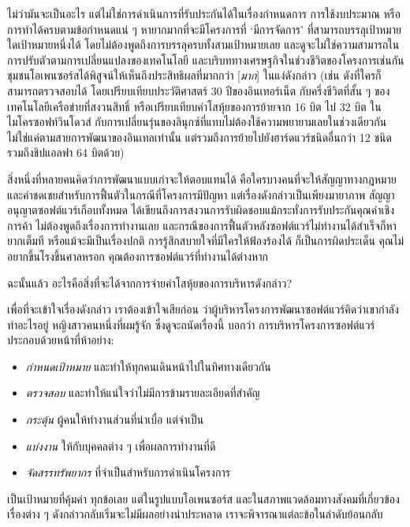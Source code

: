 ไม่ว่ามันจะเป็นอะไร แต่ไม่ใช่การดำเนินการที่รับประกันได้ในเรื่องกำหนดการ
การใช้งบประมาณ หรือการทำได้ครบตามข้อกำหนดแน่ ๆ  หายากมากที่จะมีโครงการที่
`มีการจัดการ' ที่สามารถบรรลุเป้าหมายใดเป้าหมายหนึ่งได้
โดยไม่ต้องพูดถึงการบรรลุครบทั้งสามเป้าหมายเลย
และดูจะไม่ใช่ความสามารถในการปรับตัวตามการเปลี่ยนแปลงของเทคโนโลยี
และบริบททางเศรษฐกิจในช่วงชีวิตของโครงการเช่นกัน
ชุมชนโอเพนซอร์สได้พิสูจน์ให้เห็นถึงประสิทธิผลที่มากกว่า {[}\emph{มาก}{]}
ในแง่ดังกล่าว (เช่น ดังที่ใครก็สามารถตรวจสอบได้
โดยเปรียบเทียบประวัติศาสตร์ 30 ปีของอินเทอร์เน็ต กับครึ่งชีวิตที่สั้น ๆ
ของเทคโนโลยีเครือข่ายที่สงวนสิทธิ์ หรือเปรียบเทียบค่าโสหุ้ยของการย้ายจาก
16 บิต ไป 32 บิต ในไมโครซอฟท์วินโดวส์
กับการเปลี่ยนรุ่นของลินุกซ์ที่แทบไม่ต้องใช้ความพยายามเลยในช่วงเดียวกัน
ไม่ใช่แค่ตามสายการพัฒนาของอินเทลเท่านั้น
แต่รวมถึงการย้ายไปยังฮาร์ดแวร์ชนิดอื่นกว่า 12 ชนิด รวมถึงชิปแอลฟา 64
บิตด้วย)

สิ่งหนึ่งที่หลายคนคิดว่าการพัฒนาแบบเก่าจะให้ตอบแทนได้
คือใครบางคนที่จะให้สัญญาทางกฎหมาย
และค่าชดเชยสำหรับการฟื้นตัวในกรณีที่โครงการมีปัญหา
แต่เรื่องดังกล่าวเป็นเพียงมายาภาพ สัญญาอนุญาตซอฟต์แวร์เกือบทั้งหมด
ได้เขียนถึงการสงวนการรับผิดชอบแม้กระทั่งการรับประกันคุณค่าเชิงการค้า
ไม่ต้องพูดถึงเรื่องการทำงานเลย
และกรณีของการฟื้นตัวหลังซอฟต์แวร์ไม่ทำงานได้สำเร็จก็หายากเต็มที
หรือแม้จะมีเป็นเรื่องปกติ การรู้สึกสบายใจที่มีใครให้ฟ้องร้องได้
ก็เป็นการผิดประเด็น คุณไม่อยากขึ้นโรงขึ้นศาลหรอก
คุณต้องการซอฟต์แวร์ที่ทำงานได้ต่างหาก

\noindent ฉะนั้นแล้ว อะไรคือสิ่งที่จะได้จากการจ่ายค่าโสหุ้ยของการบริหารดังกล่าว?

เพื่อที่จะเข้าใจเรื่องดังกล่าว เราต้องเข้าใจเสียก่อน
ว่าผู้บริหารโครงการพัฒนาซอฟต์แวร์คิดว่าเขากำลังทำอะไรอยู่
หญิงสาวคนหนึ่งที่ผมรู้จัก ซึ่งดูจะถนัดเรื่องนี้ บอกว่า
การบริหารโครงการซอฟต์แวร์ประกอบด้วยหน้าที่ห้าอย่าง:

\begin{itemize}
  \item \emph{กำหนดเป้าหมาย} และทำให้ทุกคนเดินหน้าไปในทิศทางเดียวกัน
  \item \emph{ตรวจสอบ} และทำให้แน่ใจว่าไม่มีการข้ามรายละเอียดที่สำคัญ
  \item \emph{กระตุ้น} ผู้คนให้ทำงานส่วนที่น่าเบื่อ แต่จำเป็น
  \item \emph{แบ่งงาน} ให้กับบุคคลต่าง ๆ  เพื่อผลการทำงานที่ดี
  \item \emph{จัดสรรทรัพยากร} ที่จำเป็นสำหรับการดำเนินโครงการ
\end{itemize}

เป็นเป้าหมายที่คุ้มค่า ทุกข้อเลย แต่ในรูปแบบโอเพนซอร์ส
และในสภาพแวดล้อมทางสังคมที่เกี่ยวข้อง เรื่องต่าง ๆ
ดังกล่าวกลับเริ่มจะไม่มีผลอย่างน่าประหลาด
เราจะพิจารณาแต่ละข้อในลำดับย้อนกลับ

